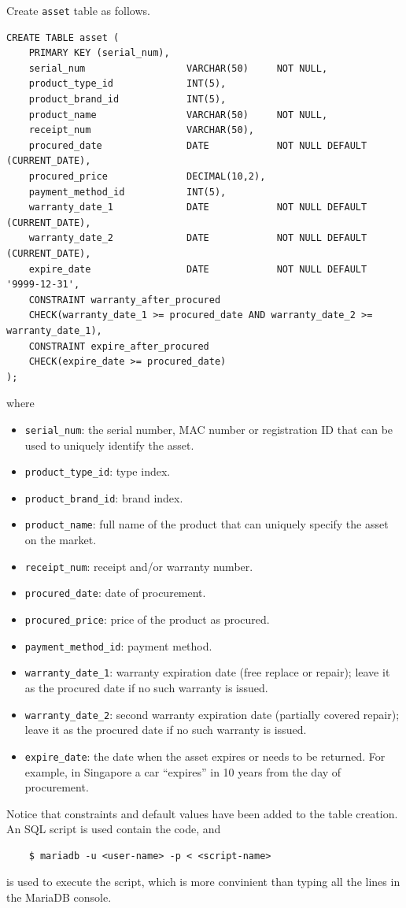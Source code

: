 Create \verb|asset| table as follows.
\begin{lstlisting}
CREATE TABLE asset (
	PRIMARY KEY (serial_num),
	serial_num                  VARCHAR(50)     NOT NULL,
	product_type_id             INT(5),
	product_brand_id            INT(5),
	product_name                VARCHAR(50)     NOT NULL,
	receipt_num                 VARCHAR(50),
	procured_date               DATE            NOT NULL DEFAULT (CURRENT_DATE),
	procured_price              DECIMAL(10,2),
	payment_method_id           INT(5),
	warranty_date_1             DATE            NOT NULL DEFAULT (CURRENT_DATE),
	warranty_date_2             DATE            NOT NULL DEFAULT (CURRENT_DATE),
	expire_date                 DATE            NOT NULL DEFAULT '9999-12-31',
	CONSTRAINT warranty_after_procured
	CHECK(warranty_date_1 >= procured_date AND warranty_date_2 >= warranty_date_1),
	CONSTRAINT expire_after_procured
	CHECK(expire_date >= procured_date)
);
\end{lstlisting}
where
\begin{itemize}
	\item \verb|serial_num|: the serial number, MAC number or registration ID that can be used to uniquely identify the asset.
	\item \verb|product_type_id|: type index.
	\item \verb|product_brand_id|: brand index.
	\item \verb|product_name|: full name of the product that can uniquely specify the asset on the market.
	\item \verb|receipt_num|: receipt and/or warranty number.
	\item \verb|procured_date|: date of procurement.
	\item \verb|procured_price|: price of the product as procured.
	\item \verb|payment_method_id|: payment method.
	\item \verb|warranty_date_1|: warranty expiration date (free replace or repair); leave it as the procured date if no such warranty is issued.
	\item \verb|warranty_date_2|: second warranty expiration date (partially covered repair); leave it as the procured date if no such warranty is issued.
	\item \verb|expire_date|: the date when the asset expires or needs to be returned. For example, in Singapore a car ``expires'' in 10 years from the day of procurement.
\end{itemize}
Notice that constraints and default values have been added to the table creation. An SQL script is used contain the code, and
\begin{lstlisting}
	$ mariadb -u <user-name> -p < <script-name>
\end{lstlisting}
is used to execute the script, which is more convinient than typing all the lines in the MariaDB console.


